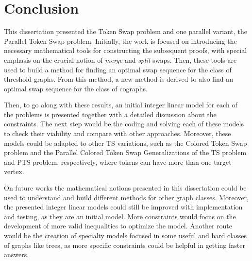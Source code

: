 \documentclass[msc]{ppgccufmg}    %
\begin{document}
\chapter{Conclusion}

This dissertation presented the Token Swap problem and one parallel variant, 
the Parallel Token Swap problem.
Initially, the work is focused on introducing the necessary mathematical tools
for constructing the subsequent proofs, with special emphasis on the crucial 
notion of \textit{merge} and \textit{split} swaps.
Then, these tools are used to build a method for finding an optimal
swap sequence for the class of threshold graphs.
From this method, a new method is derived to also find an optimal swap sequence
for the class of cographs.

Then, to go along with these results, an initial integer linear model for each
of the problems is presented together with a detailed discussion about the 
constraints.
The next step would be the coding and solving each of these models to 
check their viability and compare with other approaches.
Moreover, these models could be adapted to other TS variations, such as the 
Colored Token Swap problem and the Parallel Colored Token Swap
Generalizations of the TS problem and PTS problem, respectively, where tokens
can have more than one target vertex.


On future works the mathematical notions presented in this dissertation could 
be used to understand and build different methods for other graph classes.
Moreover, the presented integer linear models could still be improved with 
implementation and testing, as they are an initial model.
More constraints would focus on the development of more valid inequalities to
optimize the model.
Another route would be the creation of specialty models focused in some useful 
and hard classes of graphs like trees, as more specific constraints could be 
helpful in getting faster answers.
\end{document}
